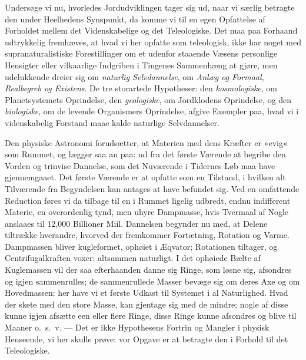 \documentclass[12pt]{book}
\newcommand{\apage}[1]{\marginnote{\footnotesize\textit{[#1]}}}
\begin{document}
Undersøge vi nu, hvorledes Jordudviklingen tager sig ud, naar vi særlig
betragte den under Heelhedens Synspunkt, da komme vi til en egen Opfattelse
af Forholdet mellem det Videnskabelige og det Teleologiske. Det maa paa
Forhaand udtrykkelig fremhæves, at hvad vi her opfatte som teleologisk,
ikke har noget med supranaturalistiske Forestillinger om et udenfor
staaende Væsens personlige Hensigter eller vilkaarlige Indgriben i Tingenes
Sammenhæng at gjøre, men udelukkende dreier sig om \emph{naturlig Selvdannelse},
om \emph{Anlæg og Formaal, Realbegreb og Existens}. De tre storartede Hypotheser:
den \emph{kosmologiske}, om Planetsystemets Oprindelse, den \emph{geologiske}, om
Jordklodens Oprindelse, og den \emph{biologiske}, om de levende Organismers
Oprindelse, afgive Exempler paa, hvad vi i videnskabelig Forstand maae
kalde naturlige Selvdannelser.

Den physiske Astronomi forudsætter, at Materien med dens Kræfter er »evig«
som Rummet, og lægger saa an paa: ud fra det første Værende at begribe den
Vorden og trinvise Dannelse, som det Nuværende i \apage{166} Tidernes Løb maa have
gjennemgaaet. Det første Værende er at opfatte som en Tilstand, i hvilken
alt Tilværende fra Begyndelsen kan antages at have befundet sig. Ved en
omfattende Reduction føres vi da tilbage til en i Rummet ligelig udbredt,
endnu indifferent Materie, en overordenlig tynd, men uhyre Dampmasse, hvis
Tvermaal af Nogle anslaaes til 12,000 Billioner Miil. Dannelsen begynder nu
med, at Delene tiltrække hverandre, hvorved der fremkommer Fortætning,
Rotation og Varme. Dampmassen bliver kugleformet, ophøiet i Æqvator;
Rotationen tiltager, og Centrifugalkraften voxer: altsammen naturligt. I
det ophøiede Bælte af Kuglemassen vil der saa efterhaanden danne sig Ringe,
som løsne sig, afsondres og igjen sammenrulles; de sammenrullede Masser
bevæge sig om deres Axe og om Hovedmassen: her have vi et første Udkast til
Systemet i al Naturlighed. Hvad der skete med den store Masse, kan gjentage
sig med de mindre; nogle af disse kunne igjen afsætte een eller flere
Ringe, disse Ringe kunne afsondres og blive til Maaner o.\ s.\ v. --- Det er
ikke Hypothesens Fortrin og Mangler i physisk Henseende, vi her skulle
prøve: vor Opgave er at betragte den i Forhold til det Teleologiske.
\end{document}
